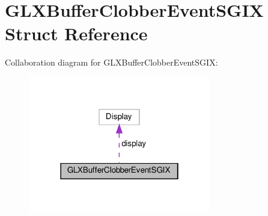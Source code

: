 \hypertarget{structGLXBufferClobberEventSGIX}{}\section{G\+L\+X\+Buffer\+Clobber\+Event\+S\+G\+IX Struct Reference}
\label{structGLXBufferClobberEventSGIX}


Collaboration diagram for G\+L\+X\+Buffer\+Clobber\+Event\+S\+G\+IX\+:
\nopagebreak
\begin{figure}[H]
\begin{center}
\leavevmode
\includegraphics[width=226pt]{structGLXBufferClobberEventSGIX__coll__graph}
\end{center}
\end{figure}

